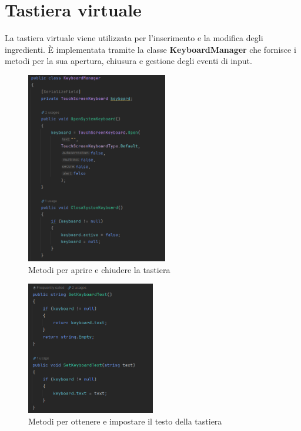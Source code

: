 \section{Tastiera virtuale}
La tastiera virtuale viene utilizzata per l'inserimento e la modifica degli ingredienti. È implementata tramite la classe \textbf{KeyboardManager} che fornisce i metodi per la sua apertura, chiusura e gestione degli eventi di input.
\begin{figure}[H]
    \centering
    \includegraphics[width=0.55\textwidth,height=\textheight,keepaspectratio]{figures/chapter_1/KeyboardManager_OPEN_CLOSE.png}
    \caption{Metodi per aprire e chiudere la tastiera}
    \label{fig:keyboardManagerOpenClose}
\end{figure}
\begin{figure}[H]
    \centering
    \includegraphics[width=0.5\textwidth,height=\textheight,keepaspectratio]{figures/chapter_1/KeyboardManager_GET_SET_TEXT.png}
    \caption{Metodi per ottenere e impostare il testo della tastiera}
    \label{fig:keyboardManagerGetSetText}
\end{figure}

